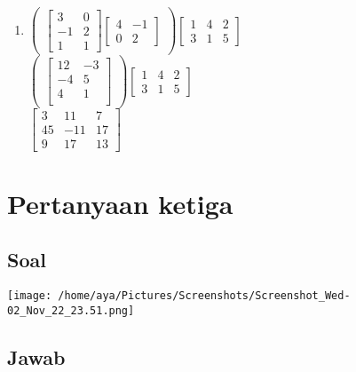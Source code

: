 \documentclass[12pt, a4paper, onecolumn, oneside, final, bahasa]{report}
\let\origfigure\figure
\let\endorigfigure\endfigure
\renewenvironment{figure}[1][2] {
    \expandafter\origfigure\expandafter[H]
} {
    \endorigfigure
}
\begin{document}
\begin{enumerate}
\item
  \(\begin{pmatrix} \begin{bmatrix} 3 & 0 \\ -1 & 2 \\ 1 & 1 \end{bmatrix} \begin{bmatrix} 4 & -1 \\ 0 & 2 \end{bmatrix} \end{pmatrix} \begin{bmatrix} 1 & 4 & 2 \\ 3 & 1 & 5 \end{bmatrix}\)\\
  \(\begin{pmatrix} \begin{bmatrix} 12 & -3 \\ -4 & 5 \\ 4 & 1 \\ \end{bmatrix} \end{pmatrix} \begin{bmatrix} 1 & 4 & 2 \\ 3 & 1 & 5 \end{bmatrix}\)\\
  \(\begin{bmatrix} 3 & 11 & 7 \\ 45 & -11 & 17 \\ 9 & 17 & 13 \end{bmatrix}\)
\end{enumerate}

\hypertarget{pertanyaan-ketiga}{%
\chapter{Pertanyaan ketiga}\label{pertanyaan-ketiga}}

\hypertarget{soal-2}{%
\section{Soal}\label{soal-2}}

\begin{figure}
\centering
\texttt{[image: /home/aya/Pictures/Screenshots/Screenshot\_Wed-02\_Nov\_22\_23.51.png]}
\caption{kedua}
\end{figure}

\hypertarget{jawab-2}{%
\section{Jawab}\label{jawab-2}}
\end{document}
